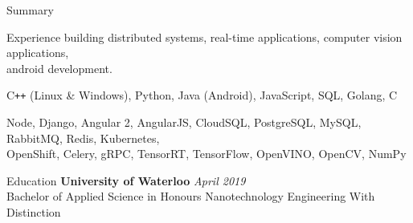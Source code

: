 \documentclass{resume}
\begin{document}
  \begin{rSection}{Summary}
    \begin{rSummary}
    {
      \item Experience building distributed systems, real-time applications, computer vision applications, \\ android development.
      \item C\texttt{++} (Linux \& Windows), Python, Java (Android), JavaScript, SQL, Golang, C
      \item Node, Django, Angular 2, AngularJS, CloudSQL, PostgreSQL, MySQL, RabbitMQ, Redis, Kubernetes,\\ OpenShift, Celery, gRPC, TensorRT, TensorFlow, OpenVINO, OpenCV, NumPy
    }
    \end{rSummary}
  \end{rSection}
  \begin{rSection}{Education}
    {\bf University of Waterloo} \hfill {\em April 2019} \\ 
    { Bachelor of Applied Science in Honours Nanotechnology Engineering With Distinction }
  \end{rSection}
\end{document}

